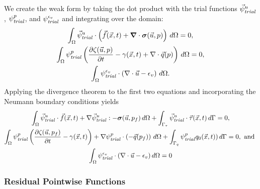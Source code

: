 %
We create the weak form by taking the dot product with the trial
functions $\trialvec[u]$, $\trialscalar[p]$, and
$\trialscalar[\epsilon_{v}]$ and
integrating over the domain:
\begin{gather}
  \int_\Omega \trialvec[u] \cdot \left( \vec{f}(\vec{x},t) + \tensor{\nabla} \cdot \tensor{\sigma} (\vec{u},p) \right) \, d\Omega = 0, \\
  \int_\Omega  \trialscalar[p] \left( \frac{\partial \zeta(\vec{u},p)}{\partial t} - \gamma(\vec{x},t) + \nabla \cdot \vec{q}(p)\right) \, d\Omega = 0,\\
  \int_{\Omega} \trialscalar[\epsilon_{v}]\cdot \left( \nabla \cdot \vec{u} - \epsilon_v \right) \, d\Omega.
\end{gather}
%
Applying the divergence theorem to the first two equations and
incorporating the Neumann boundary conditions yields
\begin{gather}
  \int_\Omega \trialvec[u] \cdot \vec{f}(\vec{x},t) + \nabla \trialvec[u] : -\tensor{\sigma}(\vec{u},p_f) \,
  d\Omega + \int_{\Gamma_\tau} \trialvec[u] \cdot \vec{\tau}(\vec{x},t) \, d\Gamma = 0, \\
  \int_\Omega  \trialscalar[p] \left( \frac{\partial \zeta(\vec{u},p_f)}{\partial t} - \gamma(\vec{x},t)\right)
  + \nabla \trialscalar[p] \cdot \left(-\vec{q}(p_f)\right) \, d\Omega + \int_{\Gamma_q} \trialscalar[p] q_0(\vec{x},t))\, d\Gamma = 0, \text{ and } \\
  \int_{\Omega} \trialscalar[\epsilon_{v}] \cdot \left(\nabla \cdot \vec{u} - \epsilon_{v} \right) d\Omega = 0
\end{gather}

\subsubsection{Residual Pointwise Functions}

